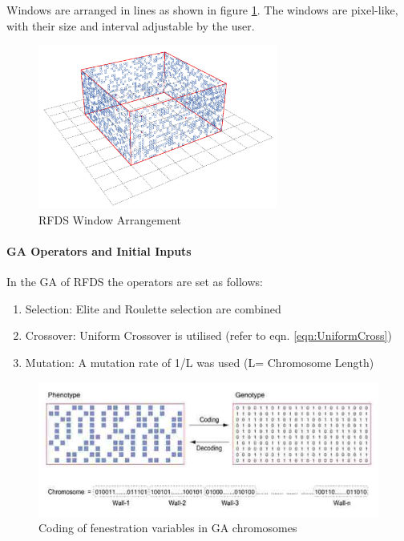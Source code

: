 Windows are arranged in lines as shown in figure \ref{fig:RFDSWin}. The windows are pixel-like, with their size and interval adjustable by the user.

\begin{figure}[H]
\centering
\includegraphics[width=0.7\textwidth]{./Images/26-RFDSWindows}
\caption[RFDS Window Arrangement]{RFDS Window Arrangement \cite{kawakita08}}
\label{fig:RFDSWin}
\end{figure}

\paragraph{GA Operators and Initial Inputs}\mbox{}

In the GA of RFDS the operators are set as follows:

\begin{enumerate}[nolistsep]
\item Selection: Elite and Roulette selection are combined
\item Crossover: Uniform Crossover is utilised (refer to eqn. \ref{eqn:UniformCross})
\item Mutation: A mutation rate of 1/L was used (L= Chromosome Length)
\end{enumerate}

\begin{figure}[hbtp]
\centering
\includegraphics[width=\textwidth]{../Chapter3/Images/17-kawakitaChromo}
\caption[Chromosome Coding]{Coding of fenestration variables in GA chromosomes \cite{kawakita08}}
\label{kawakitaChromo}
\end{figure}

